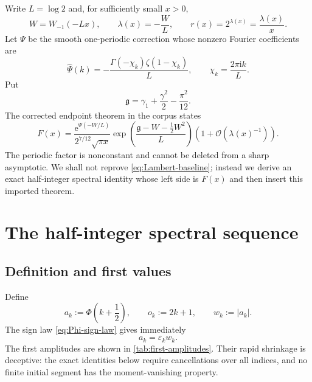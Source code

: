 \documentclass[11pt,oneside]{article}
\theoremstyle{definition}
\theoremstyle{remark}
\newcommand{\e}{\mathrm e}
\newcommand{\ii}{\mathrm i}
\newcommand{\bigO}{\mathcal O}
\newcommand{\eps}{\varepsilon}
\newcommand{\PhiU}{\Phi}
\begin{document}
Write $L=\log2$ and, for sufficiently small $x>0$,
\begin{equation}\label{eq:lambda-W-def}
 W=W_{-1}(-Lx),
 \qquad
 \lambda(x)=-\frac WL,
 \qquad
 r(x)=2^{\lambda(x)}=\frac{\lambda(x)}x.
\end{equation}
Let $\Psi$ be the smooth one-periodic correction whose nonzero Fourier
coefficients are
\begin{equation}\label{eq:Psi-coeff-baseline}
 \widehat\Psi(k)=-\frac{\Gamma(-\chi_k)\zeta(1-\chi_k)}L,
 \qquad
 \chi_k=\frac{2\pi\ii k}{L}.
\end{equation}
Put
\begin{equation}\label{eq:g-constant}
 \mathfrak g=\gamma_1+\frac{\gamma^2}{2}-\frac{\pi^2}{12}.
\end{equation}
The corrected endpoint theorem in the corpus states
\begin{equation}\label{eq:Lambert-baseline}
 F(x)=
 \frac{\e^{\Psi(-W/L)}}{2^{7/12}\sqrt{\pi x}}
 \exp\!\left(\frac{\mathfrak g-W-\tfrac12W^2}{L}\right)
 \left(1+\bigO\!\left(\lambda(x)^{-1}\right)\right).
\end{equation}
The periodic factor is nonconstant and cannot be deleted from a sharp
asymptotic.  We shall not reprove \eqref{eq:Lambert-baseline}; instead we derive
an exact half-integer spectral identity whose left side is $F(x)$ and then
insert this imported theorem.

\section{The half-integer spectral sequence}\label{sec:half-spectrum}

\subsection{Definition and first values}

Define
\begin{equation}\label{eq:a-k-def}
 a_k:=\PhiU\!\left(k+\frac12\right),
 \qquad
 o_k:=2k+1,
 \qquad
 w_k:=|a_k|.
\end{equation}
The sign law \eqref{eq:Phi-sign-law} gives immediately
\begin{equation}\label{eq:a-sign}
 a_k=\eps_k w_k.
\end{equation}
The first amplitudes are shown in \cref{tab:first-amplitudes}.  Their rapid
shrinkage is deceptive: the exact identities below require cancellations over
all indices, and no finite initial segment has the moment-vanishing property.
\end{document}
